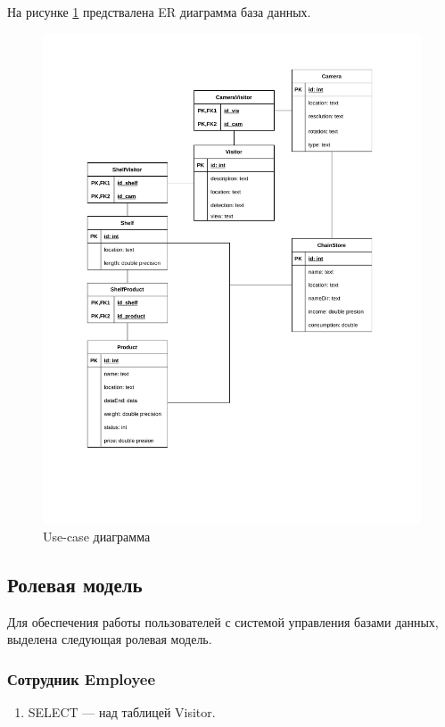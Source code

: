 На рисунке \ref{fig:cons:ER} предствалена ER диаграмма база данных.

\begin{figure}[ht!]
	\centering
	\includegraphics[width=1\linewidth]{assets/images/ER-diagram.drawio.pdf}
	\caption{Use-case диаграмма}
	\label{fig:cons:ER}
\end{figure}
\FloatBarrier

\subsection{Ролевая модель}

Для обеспечения работы пользователей с системой управления базами данных, выделена
следующая ролевая модель.

\subsubsection{Сотрудник Employee}

\begin{enumerate}[label=\arabic*.]
    \item SELECT --- над таблицей Visitor.
\end{enumerate}


